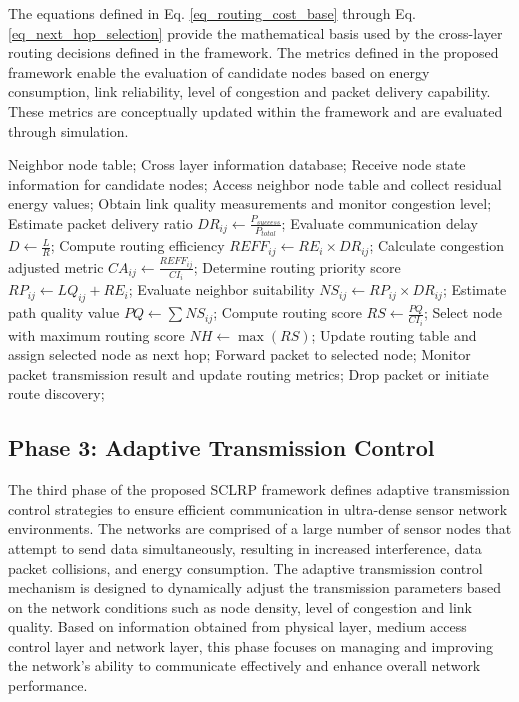 \documentclass[a4paper,fleqn]{cas-dc}
\numberwithin{equation}{section}
\begin{document}
The equations defined in Eq. \ref{eq_routing_cost_base} through Eq. \ref{eq_next_hop_selection} provide the mathematical basis used by the cross-layer routing decisions defined in the framework. The metrics defined in the proposed framework enable the evaluation of candidate nodes based on energy consumption, link reliability, level of congestion and packet delivery capability. These metrics are conceptually updated within the framework and are evaluated through simulation.

\begin{algorithm}
\caption{Cross Layer Routing Decision}
\begin{algorithmic}[1]
\REQUIRE 
    Neighbor node table; 
    Cross layer information database;
\STATE Receive node state information for candidate nodes;
\REPEAT
    \STATE Access neighbor node table and collect residual energy values;
    \STATE Obtain link quality measurements and monitor congestion level;
    \STATE Estimate packet delivery ratio $DR_{ij} \leftarrow \frac{P_{success}}{P_{total}}$;
    \STATE Evaluate communication delay $D \leftarrow \frac{L}{R}$;
    \STATE Compute routing efficiency $REFF_{ij} \leftarrow RE_i \times DR_{ij}$;
    \STATE Calculate congestion adjusted metric $CA_{ij} \leftarrow \frac{REFF_{ij}}{CI_i}$;
    \STATE Determine routing priority score $RP_{ij} \leftarrow LQ_{ij} + RE_i$;
    \STATE Evaluate neighbor suitability $NS_{ij} \leftarrow RP_{ij} \times DR_{ij}$;
    \STATE Estimate path quality value $PQ \leftarrow \sum NS_{ij}$;
    \STATE Compute routing score $RS \leftarrow \frac{PQ}{CI_i}$;
        \STATE Select node with maximum routing score $NH \leftarrow \max(RS)$;
        \STATE Update routing table and assign selected node as next hop;
        \STATE Forward packet to selected node;
        \STATE Monitor packet transmission result and update routing metrics;
    \ELSE
        \STATE Drop packet or initiate route discovery;
        \RETURN
    \ENDIF
{}
\end{algorithmic}
\end{algorithm}

\subsection{Phase 3: Adaptive Transmission Control}

The third phase of the proposed SCLRP framework defines adaptive transmission control strategies to ensure efficient communication in ultra-dense sensor network environments. The networks are comprised of a large number of sensor nodes that attempt to send data simultaneously, resulting in increased interference, data packet collisions, and energy consumption. The adaptive transmission control mechanism is designed to dynamically adjust the transmission parameters based on the network conditions such as node density, level of congestion and link quality. Based on information obtained from physical layer, medium access control layer and network layer, this phase focuses on managing and improving the network's ability to communicate effectively and enhance overall network performance.
\end{document}
